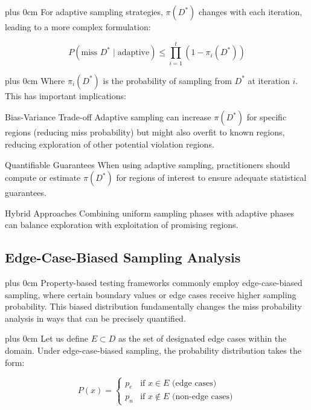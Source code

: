 \documentclass[11pt,a4paper]{article}
\newcommand{\justifytext}{\leftskip=0pt \rightskip=0pt plus 0cm}
\begin{document}
\justifytext
For adaptive sampling strategies, $\pi(D^*)$ changes with each iteration, leading to a more complex formulation:

\begin{equation}
P(\text{miss } D^* \mid \text{adaptive}) \leq \prod_{i=1}^t (1 - \pi_i(D^*))
\end{equation}

\justifytext
Where $\pi_i(D^*)$ is the probability of sampling from $D^*$ at iteration $i$. This has important implications:

\begin{theorembox}{Bias-Variance Trade-off}
Adaptive sampling can increase $\pi(D^*)$ for specific regions (reducing miss probability) but might also overfit to known regions, reducing exploration of other potential violation regions.
\end{theorembox}

\begin{theorembox}{Quantifiable Guarantees}
When using adaptive sampling, practitioners should compute or estimate $\pi(D^*)$ for regions of interest to ensure adequate statistical guarantees.
\end{theorembox}

\begin{theorembox}{Hybrid Approaches}
Combining uniform sampling phases with adaptive phases can balance exploration with exploitation of promising regions.
\end{theorembox}

\subsection{Edge-Case-Biased Sampling Analysis}

\justifytext
Property-based testing frameworks commonly employ edge-case-biased sampling, where certain boundary values or edge cases receive higher sampling probability. This biased distribution fundamentally changes the miss probability analysis in ways that can be precisely quantified.

\justifytext
Let us define $E \subset D$ as the set of designated edge cases within the domain. Under edge-case-biased sampling, the probability distribution takes the form:

\begin{equation}
P(x) = \begin{cases}
p_e & \text{if } x \in E \text{ (edge cases)} \\
p_n & \text{if } x \notin E \text{ (non-edge cases)}
\end{cases}
\end{equation}
\end{document}
